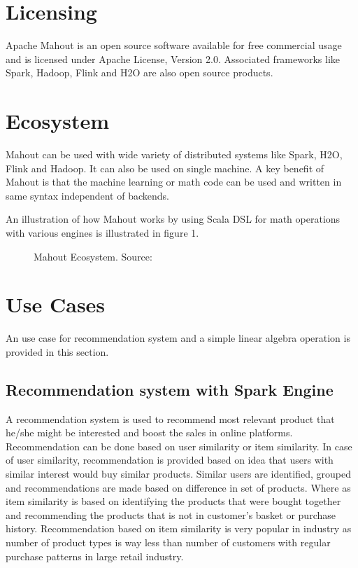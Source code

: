 \documentclass[9pt,twocolumn,twoside]{../../styles/osajnl}
\begin{document}
\section{Licensing}
Apache Mahout is an open source software available for free commercial
usage and is licensed under Apache License, Version
2.0\cite{www-mahoutLicense}. Associated frameworks like Spark,
  Hadoop, Flink and H2O are also open source products.




\section{Ecosystem}
Mahout can be used with wide variety of distributed systems like
Spark, H2O, Flink and Hadoop. It can also be used on single machine. A
key benefit of Mahout is that the machine learning or math code can be
used and written in same syntax independent of backends.

An illustration of how Mahout works by using Scala DSL for math
operations with various engines is illustrated in figure 1.

\begin{figure}[htbp]
\centering
{}
\caption{Mahout Ecosystem. \newline Source: \cite{www-weatheringDays}}
\label{fig:false-color}
\end{figure}
\section{Use Cases}

An use case for recommendation system and a simple linear algebra
operation is provided in this section.

\subsection{Recommendation system with Spark Engine}
A recommendation system is used to recommend most relevant product
that he/she might be interested and boost the sales in online
platforms. Recommendation can be done based on user similarity or item
similarity. In case of user similarity, recommendation is provided
based on idea that users with similar interest would buy similar
products. Similar users are identified, grouped and recommendations
are made based on difference in set of products. Where as item
similarity is based on identifying the products that were bought
together and recommending the products that is not in customer's
basket or purchase history. Recommendation based on item similarity is
very popular in industry as number of product types is way less than
number of customers with regular purchase patterns in large retail
industry.
\end{document}
